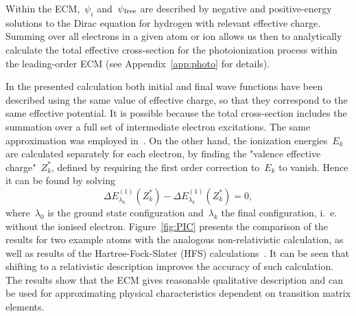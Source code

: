 Within the ECM,~$\psi_i$ and~$\psi_{\rm{free}}$ are
described by negative and positive-energy solutions to the Dirac
equation for hydrogen with relevant effective charge. Summing over all
electrons in a given atom or ion allows us then to analytically
calculate the total effective cross-section for the photoionization
process within the leading-order ECM (see Appendix~\ref{app:photo} for details).

In the presented calculation both initial and final wave functions have
been described using the same value of effective charge, so that they correspond to the same
effective potential. It is possible because the total cross-section
includes the summation over a full set of intermediate electron
excitations. The same approximation was employed in~\cite{YEH19851}.  On the other hand, the ionization
energies~$E_k$ are calculated separately for each electron, by finding
the "valence effective charge"~$Z^*_k$, defined by requiring the first
order correction to~$E_k$ to vanish. Hence it can be found by solving
\begin{equation}
  \Delta E^{(1)}_{\lambda_0}(Z^*_k)-\Delta E^{(1)}_{\lambda_k}(Z^*_k)=0,
\end{equation}
where~$\lambda_0$ is the ground state configuration and~$\lambda_k$
the final configuration, i.~e. without the ionised electron.
Figure~\ref{fig:PIC} presents the comparison of the results for two
example atoms with the analogous non-relativistic calculation, as well
as results of the Hartree-Fock-Slater (HFS) calculations~\cite{YEH19851}. It can be seen that shifting to a relativistic
description improves the accuracy of such calculation. The results
show that the ECM gives reasonable qualitative
description and can be used for approximating physical characteristics
dependent on transition matrix elements.

